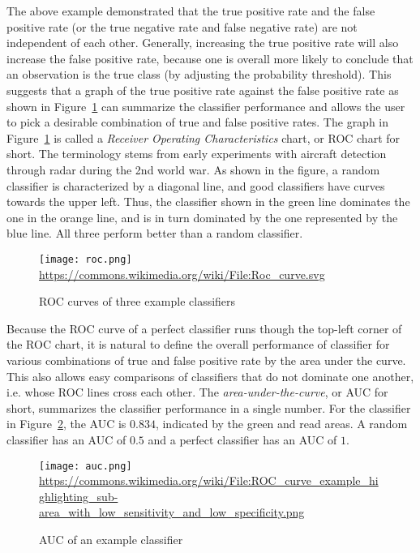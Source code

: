 The above example demonstrated that the true positive rate and the false positive rate (or the true negative rate and false negative rate) are not independent of each other. Generally, increasing the true positive rate will also increase the false positive rate, because one is overall more likely to conclude that an observation is the true class (by adjusting the probability threshold). This suggests that a graph of the true positive rate against the false positive rate as shown in Figure~\ref{fig:roc} can summarize the classifier performance and allows the user to pick a desirable combination of true and false positive rates. The graph in Figure~\ref{fig:roc} is called a \emph{Receiver Operating Characteristics} chart, or ROC chart for short. The terminology stems from early experiments with aircraft detection through radar during the 2nd world war. As shown in the figure, a random classifier is characterized by a diagonal line, and good classifiers have curves towards the upper left. Thus, the classifier shown in the green line dominates the one in the orange line, and is in turn dominated by the one represented by the blue line. All three perform better than a random classifier.

\begin{figure}
\centering
\texttt{[image: roc.png]}
\scriptsize \url{https://commons.wikimedia.org/wiki/File:Roc_curve.svg}
\caption{ROC curves of three example classifiers}
\label{fig:roc}
\end{figure}

Because the ROC curve of a perfect classifier runs though the top-left corner of the ROC chart, it is natural to define the overall performance of classifier for various combinations of true and false positive rate by the area under the curve. This also allows easy comparisons of classifiers that do not dominate one another, i.e. whose ROC lines cross each other. The \emph{area-under-the-curve}, or AUC for short, summarizes the classifier performance in a single number. For the classifier in Figure~\ref{fig:auc}, the AUC is $0.834$, indicated by the green and read areas. A random classifier has an AUC of $0.5$ and a perfect classifier has an AUC of $1$. 

\begin{figure}
\centering
\texttt{[image: auc.png]}
\scriptsize \url{https://commons.wikimedia.org/wiki/File:ROC_curve_example_highlighting_sub-area_with_low_sensitivity_and_low_specificity.png}

\caption{AUC of an example classifier}
\label{fig:auc}
\end{figure}

